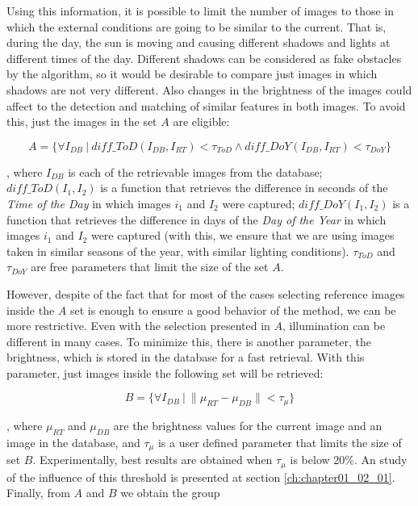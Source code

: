 Using this information, it is possible to limit the number of images to those in which the external conditions are going to be similar to the current. That is, during the day, the sun is moving and causing different shadows and lights at different times of the day. Different shadows can be considered as fake obstacles by the algorithm, so it would be desirable to compare just images in which shadows are not very different. Also changes in the brightness of the images could affect to the detection and matching of similar features in both images. To avoid this, just the images in the set $A$ are eligible:

\begin{equation}\label{eq:cp01_eligible_images_by_time}
A = \{ \forall I_{DB} ~|~ diff\_ToD(I_{DB}, I_{RT}) < \tau_{ToD} \wedge diff\_DoY(I_{DB}, I_{RT}) < \tau_{DoY} \}
\end{equation}

, where $I_{DB}$ is each of the retrievable images from the database; $diff\_ToD(I_1, I_2)$ is a function that retrieves the difference in seconds of the \emph{Time of the Day} in which images $i_1$ and $I_2$ were captured; $diff\_DoY(I_1, I_2)$ is a function that retrieves the difference in days of the \emph{Day of the Year} in which images $i_1$ and $I_2$ were captured (with this, we ensure that we are using images taken in similar seasons of the year, with similar lighting conditions). $\tau_{ToD}$ and $\tau_{DoY}$ are free parameters that limit the size of the set $A$.

However, despite of the fact that for most of the cases selecting reference images inside the $A$ set is enough to ensure a good behavior of the method, we can be more restrictive. Even with the selection presented in $A$, illumination can be different in many cases. To minimize this, there is another parameter, the brightness, which is stored in the database for a fast retrieval. With this parameter, just images inside the following set will be retrieved:

\begin{equation}\label{eq:cp01_eligible_images_by_brightness}
B = \{ \forall I_{DB} ~|~ \| \mu_{RT} - \mu_{DB} \| < \tau_{\mu} \}
\end{equation}

, where $\mu_{RT}$ and $\mu_{DB}$ are the brightness values for the current image and an image in the database, and $\tau_{\mu}$ is a user defined parameter that limits the size of set $B$. Experimentally, best results are obtained when $\tau_{\mu}$ is below 20\%. An study of the influence of this threshold is presented at section \ref{ch:chapter01_02_01}. Finally, from $A$ and $B$ we obtain the group

